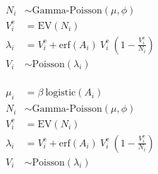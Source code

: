\documentclass[12pt,preview,border=0]{standalone}
\newcommand\EV{V^\text{e}_{i}}
\newcommand\A{A_{i}}
\newcommand\N{N_{i}}
\newcommand\V{V_{i}}
\begin{document}
$$
\begin{aligned} 
    \N        & \sim \text{Gamma-Poisson}(\mu, \phi) \\
    \EV       &    = \text{EV}(\N) \\
    \lambda_i &    = \EV + \text{erf}(\A) ~ \EV ~ (1 - \frac{\EV}{\N}) \\
    \V        & \sim \text{Poisson}(\lambda_i)
\end{aligned}
$$
\\
$$
\begin{aligned}
    \mu_i     &    = \beta ~  \text{logistic}(\A) \\
    \N        & \sim \text{Gamma-Poisson}(\mu, \phi) \\
    \EV       &    = \text{EV}(\N) \\
    \lambda_i &    = \EV + \text{erf}(\A) ~ \EV ~ (1 - \frac{\EV}{\N}) \\
    \V        & \sim \text{Poisson}(\lambda_i)
\end{aligned}
$$
\end{document}
